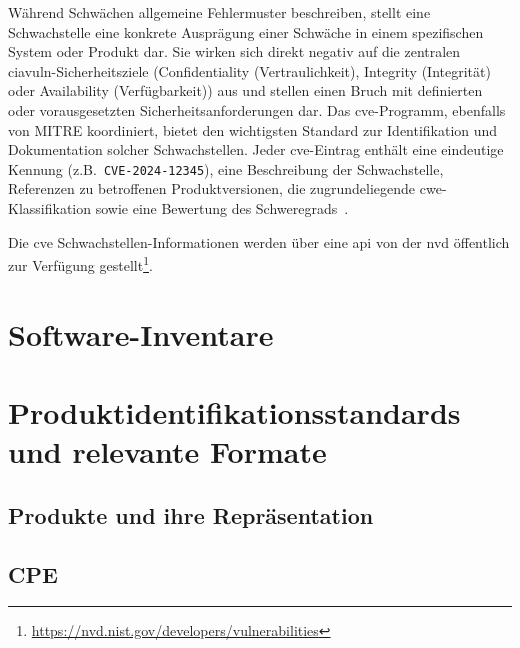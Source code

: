Während Schwächen allgemeine Fehlermuster beschreiben, stellt eine Schwachstelle eine konkrete Ausprägung einer Schwäche in einem spezifischen System oder Produkt dar.
Sie wirken sich direkt negativ auf die zentralen \acrshort{ciavuln}-Sicherheitsziele (Confidentiality (Vertraulichkeit), Integrity (Integrität) oder Availability (Verfügbarkeit)) aus und stellen einen Bruch mit definierten oder vorausgesetzten Sicherheitsanforderungen dar.
Das \acrshort{cve}-Programm, ebenfalls von MITRE koordiniert, bietet den wichtigsten Standard zur Identifikation und Dokumentation solcher Schwachstellen.
Jeder \acrshort{cve}-Eintrag enthält eine eindeutige Kennung (z.B.\ \verb+CVE-2024-12345+), eine Beschreibung der Schwachstelle, Referenzen zu betroffenen Produktversionen, die zugrundeliegende \acrshort{cwe}-Klassifikation sowie eine Bewertung des Schweregrads\ \autocite{Ross_Winstead_McEvilley_2022, CveGlossaryCommonVulnerabilitiesAndExposures12mai2025}.

Die \acrshort{cve} Schwachstellen-Informationen werden über eine \acrshort{api} von der \acrshort{nvd} öffentlich zur Verfügung gestellt\footnote{\url{https://nvd.nist.gov/developers/vulnerabilities}}.


\section{Software-Inventare}\label{sec:def-inventories}




\section{Produktidentifikationsstandards und relevante Formate}

\subsection{Produkte und ihre Repräsentation}


\subsection{CPE}

